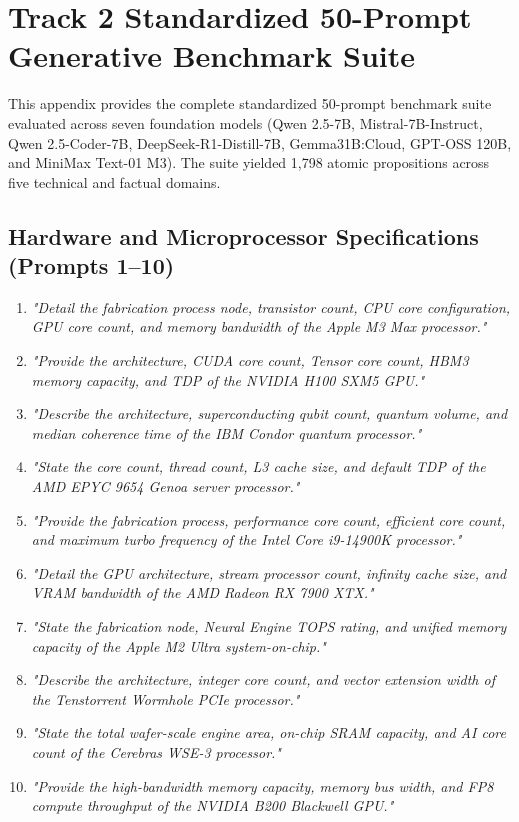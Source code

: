 \chapter{Track 2 Standardized 50-Prompt Generative Benchmark Suite}
\label{app:prompts_suite}

This appendix provides the complete standardized 50-prompt benchmark suite evaluated across seven foundation models (Qwen 2.5-7B, Mistral-7B-Instruct, Qwen 2.5-Coder-7B, DeepSeek-R1-Distill-7B, Gemma31B:Cloud, GPT-OSS 120B, and MiniMax Text-01 M3). The suite yielded 1,798 atomic propositions across five technical and factual domains.

\section{Hardware and Microprocessor Specifications (Prompts 1--10)}
\label{sec:app_hardware_prompts}

\begin{enumerate}
    \item \textit{"Detail the fabrication process node, transistor count, CPU core configuration, GPU core count, and memory bandwidth of the Apple M3 Max processor."}
    \item \textit{"Provide the architecture, CUDA core count, Tensor core count, HBM3 memory capacity, and TDP of the NVIDIA H100 SXM5 GPU."}
    \item \textit{"Describe the architecture, superconducting qubit count, quantum volume, and median coherence time of the IBM Condor quantum processor."}
    \item \textit{"State the core count, thread count, L3 cache size, and default TDP of the AMD EPYC 9654 Genoa server processor."}
    \item \textit{"Provide the fabrication process, performance core count, efficient core count, and maximum turbo frequency of the Intel Core i9-14900K processor."}
    \item \textit{"Detail the GPU architecture, stream processor count, infinity cache size, and VRAM bandwidth of the AMD Radeon RX 7900 XTX."}
    \item \textit{"State the fabrication node, Neural Engine TOPS rating, and unified memory capacity of the Apple M2 Ultra system-on-chip."}
    \item \textit{"Describe the architecture, integer core count, and vector extension width of the Tenstorrent Wormhole PCIe processor."}
    \item \textit{"State the total wafer-scale engine area, on-chip SRAM capacity, and AI core count of the Cerebras WSE-3 processor."}
    \item \textit{"Provide the high-bandwidth memory capacity, memory bus width, and FP8 compute throughput of the NVIDIA B200 Blackwell GPU."}
\end{enumerate}

